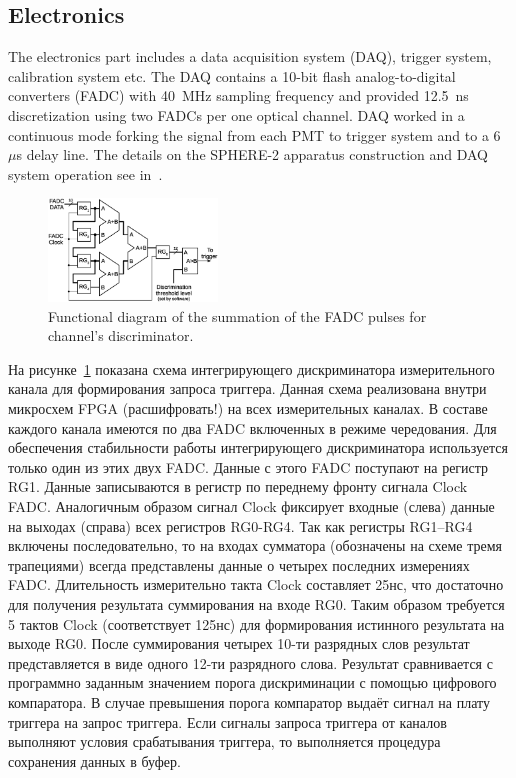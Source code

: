 \documentclass[final,5p,times,twocolumn]{elsarticle}
\begin{document}
\subsection{Electronics}
The electronics part includes a data acquisition system (DAQ), trigger system, calibration system etc. The DAQ contains a 10-bit flash analog-to-digital converters (FADC) with 40~MHz sampling frequency and provided 12.5~ns discretization using two \mbox{FADCs} per one optical channel. DAQ worked in a continuous mode forking the signal from each PMT to trigger system and to a 6~$\mu$s delay line. The details on the \mbox{SPHERE-2} apparatus construction and DAQ system operation see in~\cite{Ant15a}. 

\begin{figure}[tb]
    \centering
    \includegraphics[width=0.4\textwidth]{figs/int_discr.eps}
    \caption{Functional diagram of the summation of the FADC pulses for channel's discriminator.}
\label{fig:int_discr}
\end{figure}

{\Russian
На рисунке~\ref{fig:int_discr} показана схема интегрирующего дискриминатора измерительного канала для формирования запроса триггера. Данная схема реализована внутри микросхем FPGA (расшифровать!) на всех измерительных каналах. В составе каждого канала имеются по два FADC включенных в режиме чередования. Для обеспечения стабильности работы интегрирующего дискриминатора используется только один из этих двух FADC. Данные с этого FADC поступают на регистр RG1. Данные записываются в регистр по переднему фронту сигнала Clock FADC. Аналогичным образом сигнал Clock фиксирует входные (слева) данные на выходах (справа) всех регистров RG0-RG4. Так как регистры RG1--RG4 включены последовательно, то на входах сумматора (обозначены на схеме тремя трапециями) всегда представлены данные о четырех последних измерениях FADC. Длительность измерительно такта Clock составляет 25нс, что достаточно для получения результата суммирования на входе RG0. Таким образом требуется 5 тактов Clock (соответствует 125нс) для формирования истинного результата на выходе RG0. После суммирования четырех 10-ти разрядных слов результат представляется в виде одного 12-ти разрядного слова. Результат сравнивается с программно заданным значением порога дискриминации с помощью цифрового компаратора. В случае превышения порога компаратор выдаёт сигнал на плату триггера на запрос триггера. Если сигналы запроса триггера от каналов выполняют условия срабатывания триггера, то выполняется процедура сохранения данных в буфер.    
}
\end{document}
